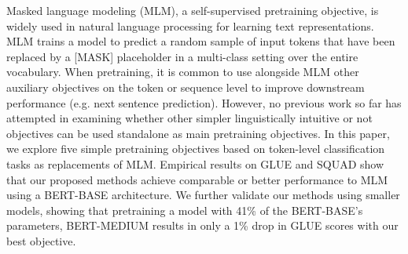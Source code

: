 Masked language modeling (MLM), a self-supervised pretraining objective, is widely used in natural language processing for learning text representations. MLM trains a model to predict a random sample of input tokens that have been replaced by a [MASK] placeholder in a multi-class setting over the entire vocabulary. When pretraining, it is common to use alongside MLM other auxiliary objectives on the token or sequence level to improve downstream performance (e.g. next sentence prediction). However, no previous work so far has attempted in examining whether other simpler linguistically intuitive or not objectives can be used standalone as main pretraining objectives. In this paper, we explore five simple pretraining objectives based on token-level classification tasks as replacements of MLM. Empirical results on GLUE and SQUAD show that our proposed methods achieve comparable or better performance to MLM using a BERT-BASE architecture. We further validate our methods using smaller models, showing that pretraining a model with 41\% of the BERT-BASE's parameters, BERT-MEDIUM results in only a 1\% drop in GLUE scores with our best objective.
